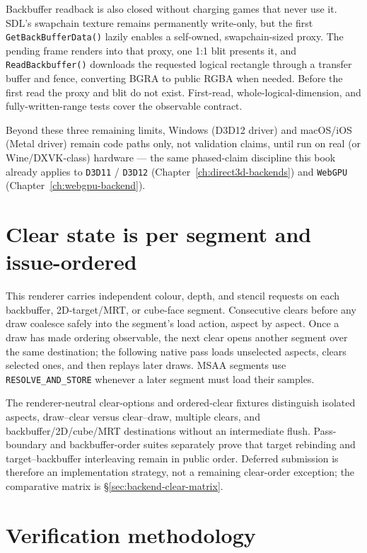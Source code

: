Backbuffer readback is also closed without charging games that never use it. SDL's swapchain
texture remains permanently write-only, but the first \texttt{GetBackBufferData()} lazily enables
a self-owned, swapchain-sized proxy. The pending frame renders into that proxy, one 1:1 blit
presents it, and \texttt{ReadBackbuffer()} downloads the requested logical rectangle through a
transfer buffer and fence, converting BGRA to public RGBA when needed. Before the first read the
proxy and blit do not exist. First-read, whole-logical-dimension, and fully-written-range tests
cover the observable contract.

Beyond these three remaining limits, Windows (D3D12 driver) and macOS/iOS (Metal driver)
remain code paths only, not validation claims, until run on real (or Wine/DXVK-class) hardware
--- the same phased-claim discipline this book already applies to \texttt{D3D11} /
\texttt{D3D12} (Chapter~\ref{ch:direct3d-backends}) and \texttt{WebGPU}
(Chapter~\ref{ch:webgpu-backend}).

\section{Clear state is per segment and issue-ordered}

This renderer carries independent colour, depth, and stencil requests on each backbuffer,
2D-target/MRT, or cube-face segment. Consecutive clears before any draw coalesce safely into the
segment's load action, aspect by aspect. Once a draw has made ordering observable, the next
clear opens another segment over the same destination; the following native pass loads
unselected aspects, clears selected ones, and then replays later draws. MSAA segments use
\texttt{RESOLVE\_AND\_STORE} whenever a later segment must load their samples.

The renderer-neutral clear-options and ordered-clear fixtures distinguish isolated aspects,
draw--clear versus clear--draw, multiple clears, and backbuffer/2D/cube/MRT destinations without
an intermediate flush. Pass-boundary and backbuffer-order suites separately prove that target
rebinding and target--backbuffer interleaving remain in public order. Deferred submission is
therefore an implementation strategy, not a remaining clear-order exception; the comparative
matrix is \S\ref{sec:backend-clear-matrix}.

\section{Verification methodology}

